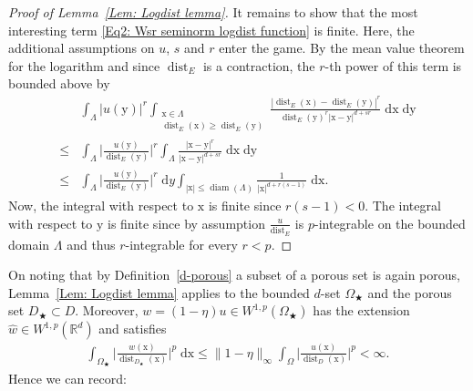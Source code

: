 \documentclass[10pt,leqno]{amsart}
\theoremstyle{definition}
\numberwithin{equation}{section}
\begin{document}
\begin{proof}[Proof of Lemma~\ref{Lem: Logdist lemma}]
It remains to show that the most interesting term \eqref{Eq2: Wsr seminorm
logdist function} is finite. Here, the additional assumptions on $u$, $s$ and
$r$ enter the game. By the mean value theorem for the logarithm and since
${\operatorname{dist}}_E$ is a contraction, the $r$-th power of this term is bounded above by
\begin{align*}
&\int_\Lambda |u({{\mathrm y}})|^r \int_{\substack{{{\mathrm x}} \in \Lambda \\ {\operatorname{dist}}_E({{\mathrm x}}) \geq
{\operatorname{dist}}_E({{\mathrm y}})}} \frac{|{\operatorname{dist}}_E({{\mathrm x}}) - {\operatorname{dist}}_E({{\mathrm y}})|^r}{{\operatorname{dist}}_E({{\mathrm y}})^r|{{\mathrm x}}-{{\mathrm y}}|^{d+sr}}
\; {{\mathrm d}} {{\mathrm x}} \; {{\mathrm d}} {{\mathrm y}} \\
\leq &\int_\Lambda \bigg|\frac{u({{\mathrm y}})}{{\operatorname{dist}}_E({{\mathrm y}})} \bigg|^r \int_{\Lambda}
\frac{|{{\mathrm x}}-{{\mathrm y}}|^r}{|{{\mathrm x}}-{{\mathrm y}}|^{d+sr}} \; {{\mathrm d}} {{\mathrm x}} \; {{\mathrm d}} {{\mathrm y}}\\
\leq  &\int_\Lambda \bigg|\frac{u({{\mathrm y}})}{{\operatorname{dist}}_E({{\mathrm y}})} \bigg|^r \; {{\mathrm d}} y
\int_{|{{\mathrm x}}| \leq {\operatorname{diam}}(\Lambda)} \frac{1}{|{{\mathrm x}}|^{d+r(s-1)}} \; {{\mathrm d}} {{\mathrm x}}.
\end{align*}
Now, the integral with respect to ${{\mathrm x}}$ is finite since $r(s-1) < 0$. The
integral with respect to ${{\mathrm y}}$ is finite since by assumption
$\frac{u}{{\operatorname{dist}}_E}$ is $p$-integrable on the bounded domain $\Lambda$ and thus
$r$-integrable for every $r<p$.
\end{proof}

On noting that by Definition~\ref{d-porous} a subset of a porous set is again
porous, Lemma~\ref{Lem: Logdist lemma} applies to the bounded $d$-set
$\Omega_\bigstar$ and the porous set $D_\bigstar \subset D$. Moreover, $w = (1-
\eta)u \in W^{1,p}(\Omega_\bigstar)$ has the extension $\widehat{w} \in
W^{1,p}({{\mathbb R}}^d)$ and satisfies
\begin{align*}
 \int_{\Omega_\bigstar} \bigg| \frac{w({{\mathrm x}})}{{\operatorname{dist}}_{D_\bigstar}({{\mathrm x}})} \bigg|^p \;
{{\mathrm d}} {{\mathrm x}}
\leq \|1-\eta\|_\infty \int_{\Omega} \bigg| \frac{u({{\mathrm x}})}{{\operatorname{dist}}_{D}({{\mathrm x}})}
\bigg|^p < \infty.
\end{align*}
Hence we can record:
\end{document}
